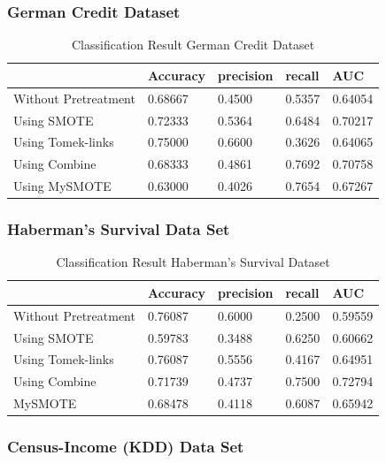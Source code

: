 \subsubsection{German Credit Dataset}

\begin{table}[H]
    \caption{Classification Result German Credit Dataset}
    \centering
    \begin{tabular}{|l|l|l|l|l|}
    \hline
         & Accuracy & precision & recall & AUC \\ \hline
        Without Pretreatment & 0.68667 & 0.4500 & 0.5357 & 0.64054 \\ \hline
        Using SMOTE & 0.72333 & 0.5364 & 0.6484 & 0.70217 \\ \hline
        Using Tomek-links & 0.75000 & 0.6600 & 0.3626 & 0.64065 \\ \hline
        Using Combine & 0.68333 & 0.4861 & 0.7692 & 0.70758 \\ \hline
        Using MySMOTE & 0.63000 & 0.4026 & 0.7654 & 0.67267 \\ \hline
    \end{tabular}
\end{table}


\subsubsection{Haberman's Survival Data Set}

\begin{table}[H]
    \caption{Classification Result Haberman's Survival Dataset}
    \centering
    \begin{tabular}{|l|l|l|l|l|}
    \hline
         & Accuracy & precision & recall & AUC \\ \hline
        Without Pretreatment & 0.76087 & 0.6000 & 0.2500 & 0.59559 \\ \hline
        Using SMOTE & 0.59783 & 0.3488 & 0.6250 & 0.60662 \\ \hline
        Using Tomek-links & 0.76087 & 0.5556 & 0.4167 & 0.64951 \\ \hline
        Using Combine & 0.71739 & 0.4737 & 0.7500 & 0.72794 \\ \hline
        MySMOTE & 0.68478 & 0.4118 & 0.6087 & 0.65942 \\ \hline
    \end{tabular}
\end{table}

\subsubsection{Census-Income (KDD) Data Set}

